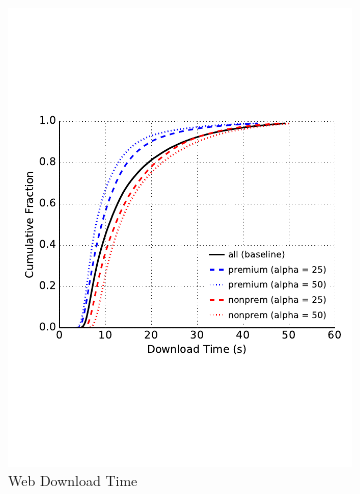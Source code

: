 \begin{figure}
\begin{subfigure}[t]{0.32\textwidth}
\includegraphics[trim={0 3cm 0 3cm}, clip, width=1.0\textwidth]{images/modifier_pr25_web.pdf}
		\caption{Web Download Time}
\label{fig:modifier_pr25_web}
	\end{subfigure}
	\begin{subfigure}[t]{0.32\textwidth} \centering

\end{subfigure}
\end{figure}
